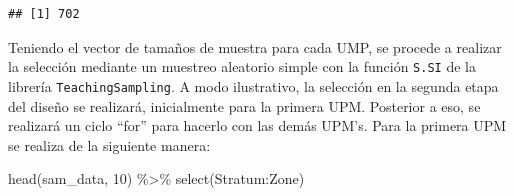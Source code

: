 \documentclass[
  12pt,
]{book}
\newenvironment{Shaded}{\begin{snugshade}}{\end{snugshade}}
\newcommand{\AttributeTok}[1]{\textcolor[rgb]{0.77,0.63,0.00}{#1}}
\newcommand{\DecValTok}[1]{\textcolor[rgb]{0.00,0.00,0.81}{#1}}
\newcommand{\FunctionTok}[1]{\textcolor[rgb]{0.00,0.00,0.00}{#1}}
\newcommand{\NormalTok}[1]{#1}
\newcommand{\OtherTok}[1]{\textcolor[rgb]{0.56,0.35,0.01}{#1}}
\newcommand{\SpecialCharTok}[1]{\textcolor[rgb]{0.00,0.00,0.00}{#1}}
\newcommand{\StringTok}[1]{\textcolor[rgb]{0.31,0.60,0.02}{#1}}
\begin{document}
\begin{verbatim}
## [1] 702
\end{verbatim}

Teniendo el vector de tamaños de muestra para cada UMP, se procede a realizar la selección mediante un muestreo aleatorio simple con la función \texttt{S.SI} de la librería \texttt{TeachingSampling}. A modo ilustrativo, la selección en la segunda etapa del diseño se realizará, inicialmente para la primera UPM. Posterior a eso, se realizará un ciclo ``for'' para hacerlo con las demás UPM's. Para la primera UPM se realiza de la siguiente manera:

\begin{Shaded}
\end{Shaded}

\begin{Shaded}
\begin{Highlighting}[]
\FunctionTok{head}\NormalTok{(sam\_data, }\DecValTok{10}\NormalTok{) }\SpecialCharTok{\%\textgreater{}\%} \FunctionTok{select}\NormalTok{(Stratum}\SpecialCharTok{:}\NormalTok{Zone)}
\end{Highlighting}
\end{Shaded}
\end{document}
